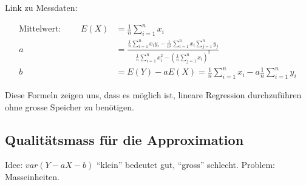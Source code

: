 \documentclass[10pt,a4paper]{scrartcl}
\DeclareMathOperator{\var}{var}
\DeclareMathOperator{\cov}{cov}
\begin{document}

Link zu Messdaten:

\begin{align*}
\text{Mittelwert: } \qquad E(X) & = \frac{1}{n}\sum_{i=1}^n x_i \\
                              a & = \frac{\frac{1}{n}\sum_{i=1}^n x_iy_i - \frac{1}{n^2}\sum_{i=1}^n x_i\sum_{j=1}^n y_j}{\frac{1}{n}\sum_{i=1}^n x_i^2 - \left(\frac{1}{n}\sum_{j=1}^n x_i\right)^2} \\
                              b & = E(Y) - aE(X) = \frac{1}{n}\sum_{i=1}^n x_i - a\frac{1}{n}\sum_{i=1}^n y_i
\end{align*}

Diese Formeln zeigen uns, dass es möglich ist, lineare Regression durchzuführen ohne grosse Speicher zu benötigen.

\subsection{Qualitätsmass für die Approximation}
Idee: $var(Y-aX-b)$ ``klein'' bedeutet gut, ``gross'' schlecht. Problem: Masseinheiten.
\end{document}
